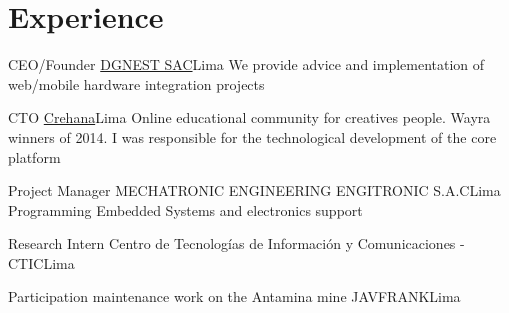 \section{Experience}

{CEO/Founder}
{\href{http://dgnest.com}{DGNEST SAC}}{Lima}
{We provide advice and implementation of web/mobile hardware integration projects}
{} 

{CTO}
{\href{http://www.crehana.com}{Crehana}}{Lima}
{Online educational community for creatives people. Wayra winners of 2014. I was responsible for the technological development of the core platform}
{} 

{Project Manager}
{MECHATRONIC ENGINEERING ENGITRONIC S.A.C}{Lima}
{Programming Embedded Systems and electronics support}
{} 

{Research Intern}
{Centro de Tecnologías de Información y Comunicaciones - CTIC}{Lima}
{}
{} 

{Participation maintenance work on the Antamina mine}
{JAVFRANK}{Lima}
{}
{}  